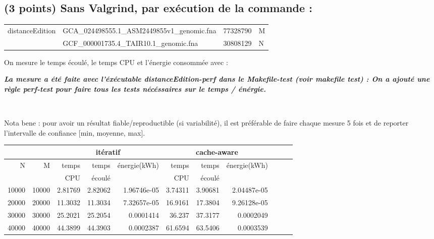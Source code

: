 \documentclass[10pt,a4paper]{article}
\begin{document}
\subsection{(3 points) Sans Valgrind, par exécution de la commande :}
{\tt \begin{tabular}{llll}
distanceEdition & GCA\_024498555.1\_ASM2449855v1\_genomic.fna & 77328790 & M \\
                & GCF\_000001735.4\_TAIR10.1\_genomic.fna     & 30808129 & N
\end{tabular}}

On mesure le temps écoulé, le temps CPU et l'énergie consommée avec : \\ {\em
\textbf{La mesure a été faite avec l'éxécutable distanceEdition-perf dans le Makefile-test (voir makefile test) : On a ajouté une règle perf-test pour faire tous les
tests nécéssaires sur le temps / énérgie. }

\\

 }

Nota bene : pour avoir un résultat fiable/reproductible (si variabilité), 
il est préférable de faire chaque mesure 5 fois et de reporter l'intervalle
de confiance [min, moyenne, max].

\begin{tabular}{|r|r||r|r|r||r|r|r||r|r|r||}
\hline
 \multicolumn{2}{|c||}{ } 
& \multicolumn{3}{c||}{itératif}
& \multicolumn{3}{c||}{cache-aware}

\\ \hline
N & M 
& temps   & temps & énergie(kWh)      %
& temps   & temps & énergie(kWh)      %

\\
& 
& CPU     & écoulé&               %
& CPU     & écoulé&               %

\\ \hline
\hline
10000 & 10000 
& 2.81769 & 2.82062  & 1.96746e-05  %
& 3.74311 & 3.90681 & 2.04487e-05  %

\\ \hline
20000 & 20000 
& 11.3032 & 11.3034 & 7.32657e-05  %
& 16.9161 & 17.3804 & 9.26128e-05  %

\\ \hline
30000 & 30000 
& 25.2021 & 25.2054 & 0.0001414 %
& 36.237 & 37.3177 & 0.0002049  %
\\ \hline
40000 & 40000 
& 44.3899  & 44.3903  & 0.0002387  %
& 61.6594 & 63.5406 & 0.0003539 %
\\ \hline
\hline
\end{tabular}
\end{document}
